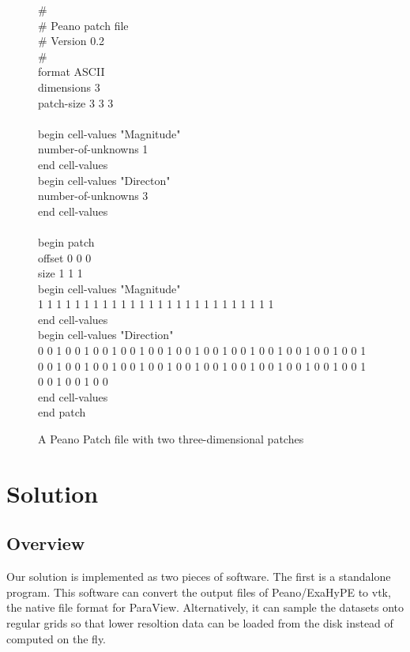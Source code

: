 \documentclass[12pt,a4paper]{article}
\begin{document}
\begin{figure}[h!]
\begin{tcolorbox}
\# \\
\# Peano patch file \\
\# Version 0.2 \\
\# \\
format ASCII \\
dimensions 3 \\
patch-size 3 3 3 \\
 \\
begin cell-values "Magnitude" \\
\null\quad number-of-unknowns 1 \\
end cell-values \\

begin cell-values "Directon" \\
\null\quad number-of-unknowns 3 \\
end cell-values \\
 \\
begin patch \\
\null\quad offset 0 0 0 \\
\null\quad size 1 1 1 \\
\null\quad begin cell-values "Magnitude" \\
\null\quad{} 1 1 1 1 1 1 1 1 1 1 1 1 1 1 1 1 1 1 1 1 1 1 1 1 1 1 \\
\null\quad end cell-values \\
\null\quad begin cell-values "Direction" \\
\null\quad{} 0 0 1 0 0 1 0 0 1 0 0 1 0 0 1 0 0 1 0 0 1 0 0 1 0 0 1 0 0 1 0 0 1 0 0 1 0 0 1 0 0 1 0 0 1 0 0 1 0 0 1 0 0 1 0 0 1 0 0 1 0 0 1 0 0 1 0 0 1 0 0 1 0 0 1 0 0 1 0 0 \\
\null\quad end cell-values \\
end patch
\end{tcolorbox}
\caption{A Peano Patch file with two three-dimensional patches}
\label{patch-file}
\end{figure}

\section{Solution}
\subsection{Overview}
Our solution is implemented as two pieces of software. The first is a standalone program. This software can convert the output files of Peano/ExaHyPE to vtk, the native file format for ParaView. Alternatively, it can sample the datasets onto regular grids so that lower resoltion data can be loaded from the disk instead of computed on the fly.
\end{document}
